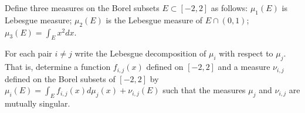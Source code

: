 Define three measures on the Borel subsets $E\subset [-2,2]$ as
follows: $\mu_1(E)$ is Lebesgue measure; $\mu_2(E)$ is the Lebesgue
measure of $E\cap (0,1)$; $\mu_3(E)=\int_E x^2 dx$. 

For each pair $i\neq j$ write the Lebesgue decomposition of $\mu_i$
with respect to $\mu_j$. That is, determine a function $f_{i,j}(x)$
defined on $[-2,2]$ and a measure $\nu_{i,j}$ defined on the Borel
subsets of $[-2,2]$ by $\mu_i(E)=\int_E f_{i,j}(x)
d\mu_j(x)+\nu_{i,j}(E)$ such that the measures $\mu_j$ and $\nu_{i,j}$
are mutually singular.
